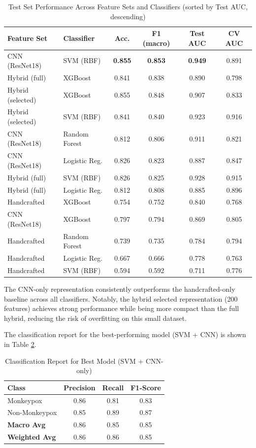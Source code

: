 \documentclass[conference]{IEEEtran}
\begin{document}
\begin{table}[htbp]
\caption{Test Set Performance Across Feature Sets and Classifiers
(sorted by Test AUC, descending)}
\label{tab:results}
\centering
\small
\begin{tabular}{@{}p{2.6cm}p{2.4cm}cccc@{}}
\toprule
\textbf{Feature Set} & \textbf{Classifier} & \textbf{Acc.} &
\textbf{F1 (macro)} & \textbf{Test AUC} & \textbf{CV AUC} \\
\midrule
CNN (ResNet18) & SVM (RBF) & \textbf{0.855} & \textbf{0.853} &
\textbf{0.949} & 0.891 \\
Hybrid (full) & XGBoost & 0.841 & 0.838 & 0.890 & 0.798 \\
Hybrid (selected) & XGBoost & 0.855 & 0.848 & 0.907 & 0.833 \\
Hybrid (selected) & SVM (RBF) & 0.841 & 0.840 & 0.923 & 0.916 \\
CNN (ResNet18) & Random Forest & 0.812 & 0.806 & 0.911 & 0.821 \\
CNN (ResNet18) & Logistic Reg. & 0.826 & 0.823 & 0.887 & 0.847 \\
Hybrid (full) & SVM (RBF) & 0.826 & 0.825 & 0.928 & 0.915 \\
Hybrid (full) & Logistic Reg. & 0.812 & 0.808 & 0.885 & 0.896 \\
Handcrafted & XGBoost & 0.754 & 0.752 & 0.840 & 0.768 \\
CNN (ResNet18) & XGBoost & 0.797 & 0.794 & 0.869 & 0.805 \\
Handcrafted & Random Forest & 0.739 & 0.735 & 0.784 & 0.794 \\
Handcrafted & Logistic Reg. & 0.667 & 0.666 & 0.778 & 0.763 \\
Handcrafted & SVM (RBF) & 0.594 & 0.592 & 0.711 & 0.776 \\
\bottomrule
\end{tabular}
\end{table}

The CNN-only representation consistently outperforms the
handcrafted-only baseline across all classifiers. Notably, the
hybrid selected representation (200 features) achieves strong
performance while being more compact than the full hybrid, reducing
the risk of overfitting on this small dataset.

The classification report for the best-performing model (SVM + CNN)
is shown in Table \ref{tab:report}.

\begin{table}[htbp]
\caption{Classification Report for Best Model (SVM + CNN-only)}
\label{tab:report}
\centering
\begin{tabular}{@{}lccc@{}}
\toprule
\textbf{Class} & \textbf{Precision} & \textbf{Recall} &
\textbf{F1-Score} \\
\midrule
Monkeypox & 0.86 & 0.81 & 0.83 \\
Non-Monkeypox & 0.85 & 0.89 & 0.87 \\
\midrule
\textbf{Macro Avg} & 0.86 & 0.85 & 0.85 \\
\textbf{Weighted Avg} & 0.86 & 0.86 & 0.85 \\
\bottomrule
\end{tabular}
\end{table}
\end{document}
